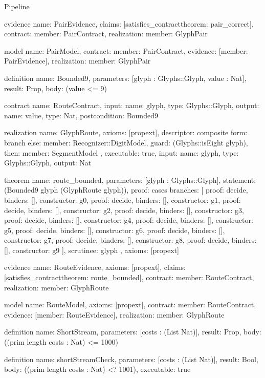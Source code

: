\begin{lexlean}{Pipeline}
\begin{semanticmodule}
evidence{
  name: PairEvidence,
  claims: [satisfies_contract{theorem: pair_correct}],
  contract: {member: PairContract},
  realization: {member: GlyphPair}
}

model{
  name: PairModel,
  contract: {member: PairContract},
  evidence: [{member: PairEvidence}],
  realization: {member: GlyphPair}
}

definition{
  name: Bounded9,
  parameters: [glyph : Glyphs::Glyph, value : Nat],
  result: Prop,
  body: (value <= 9)
}

contract{
  name: RouteContract,
  input: {name: glyph, type: Glyphs::Glyph},
  output: {name: value, type: Nat},
  postcondition: Bounded9
}

realization{
  name: GlyphRoute,
  axioms: [propext],
  descriptor: composite{
    form: branch{
      else: {member: Recognizer::DigitModel},
      guard: (Glyphs::isEight glyph),
      then: {member: SegmentModel}
    }
  },
  executable: true,
  input: {name: glyph, type: Glyphs::Glyph},
  output: Nat
}

theorem{
  name: route_bounded,
  parameters: [glyph : Glyphs::Glyph],
  statement: (Bounded9 glyph (GlyphRoute glyph)),
  proof: cases{
    branches: [
      {proof: decide{}, binders: [], constructor: g0},
      {proof: decide{}, binders: [], constructor: g1},
      {proof: decide{}, binders: [], constructor: g2},
      {proof: decide{}, binders: [], constructor: g3},
      {proof: decide{}, binders: [], constructor: g4},
      {proof: decide{}, binders: [], constructor: g5},
      {proof: decide{}, binders: [], constructor: g6},
      {proof: decide{}, binders: [], constructor: g7},
      {proof: decide{}, binders: [], constructor: g8},
      {proof: decide{}, binders: [], constructor: g9}
    ],
    scrutinee: glyph
  },
  axioms: [propext]
}

evidence{
  name: RouteEvidence,
  axioms: [propext],
  claims: [satisfies_contract{theorem: route_bounded}],
  contract: {member: RouteContract},
  realization: {member: GlyphRoute}
}

model{
  name: RouteModel,
  axioms: [propext],
  contract: {member: RouteContract},
  evidence: [{member: RouteEvidence}],
  realization: {member: GlyphRoute}
}

definition{
  name: ShortStream,
  parameters: [costs : (List Nat)],
  result: Prop,
  body: ((prim length costs : Nat) <= 1000)
}

definition{
  name: shortStreamCheck,
  parameters: [costs : (List Nat)],
  result: Bool,
  body: ((prim length costs : Nat) <? 1001),
  executable: true
}


\end{semanticmodule}
\end{lexlean}
